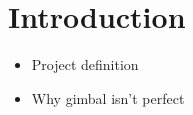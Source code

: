 \section{Introduction}

\begin{itemize}
	\item Project definition
	\item Why gimbal isn't perfect
\end{itemize}


